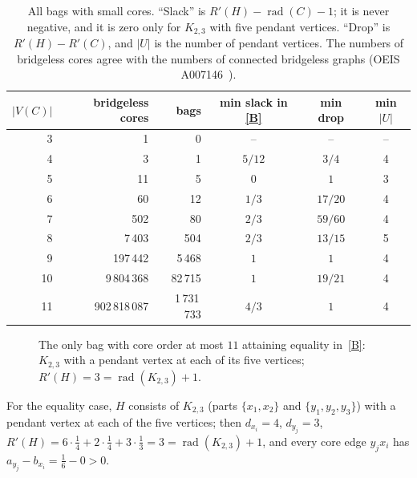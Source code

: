 \documentclass[11pt]{amsart}
\theoremstyle{definition}
\DeclareMathOperator{\rad}{rad}
\newcommand{\Rp}{R'}
\newcommand{\kmax}{11}
\begin{document}
\begin{table}[ht]
\centering
\small
\begin{tabular}{rrrccc}
\toprule
$|V(C)|$ & bridgeless cores & bags & min slack in \eqref{B} & min drop & min $|U|$\\
\midrule
3 & 1 & 0 & -- & -- & --\\
4 & 3 & 1 & $5/12$ & $3/4$ & 4\\
5 & 11 & 5 & $0$ & $1$ & 3\\
6 & 60 & 12 & $1/3$ & $17/20$ & 4\\
7 & 502 & 80 & $2/3$ & $59/60$ & 4\\
8 & 7\,403 & 504 & $2/3$ & $13/15$ & 5\\
9 & 197\,442 & 5\,468 & $1$ & $1$ & 4\\
10 & 9\,804\,368 & 82\,715 & $1$ & $19/21$ & 4\\
11 & 902\,818\,087 & 1\,731\,733 & $4/3$ & $1$ & 4\\
\bottomrule
\end{tabular}
\medskip
\caption{All bags with small cores. ``Slack'' is $\Rp(H)-\rad(C)-1$; it is never negative, and it is zero only for
$K_{2,3}$ with five pendant vertices. ``Drop'' is $\Rp(H)-\Rp(C)$, and $|U|$ is the number of pendant vertices. The numbers of bridgeless cores agree with
the numbers of connected bridgeless graphs (OEIS A007146~\cite{OEIS2}).}\label{tab:bags}
\end{table}

\begin{figure}[ht]
\centering
{}
\caption{The only bag with core order at most $\kmax$ attaining equality in~\eqref{B}: $K_{2,3}$ with a pendant vertex at
each of its five vertices; $\Rp(H)=3=\rad(K_{2,3})+1$.}\label{fig:k23}
\end{figure}

For the equality case, $H$ consists of $K_{2,3}$ (parts $\{x_1,x_2\}$ and $\{y_1,y_2,y_3\}$) with a pendant vertex at
each of the five vertices; then $d_{x_i}=4$, $d_{y_j}=3$, $\Rp(H)=6\cdot\frac14+2\cdot\frac14+3\cdot\frac13=3=\rad(K_{2,3})+1$,
and every core edge $y_jx_i$ has $a_{y_j}-b_{x_i}=\frac16-0>0$.
\end{document}
